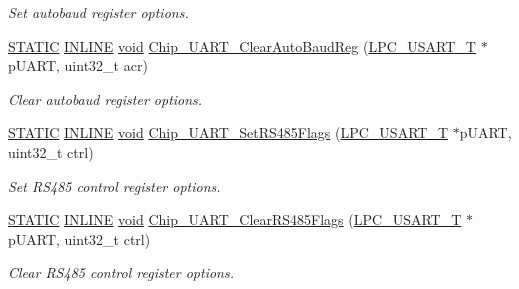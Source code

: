 \begin{DoxyCompactItemize}
\begin{DoxyCompactList}\small\item\em Set autobaud register options. \end{DoxyCompactList}\item 
\hyperlink{group__LPC__Types__Public__Macros_ga10b2d890d871e1489bb02b7e70d9bdfb}{S\-T\-A\-T\-I\-C} \hyperlink{group__LPC__Types__Public__Types_ga2eb6f9e0395b47b8d5e3eeae4fe0c116}{I\-N\-L\-I\-N\-E} \hyperlink{Paradigm_2Tern__EE_2small_2portmacro_8h_a14d32f8130d3c0b212cfc751730b5b49}{void} \hyperlink{group__UART__17XX__40XX_ga6a6d30f304047175780d16207bab2b09}{Chip\-\_\-\-U\-A\-R\-T\-\_\-\-Clear\-Auto\-Baud\-Reg} (\hyperlink{structLPC__USART__T}{L\-P\-C\-\_\-\-U\-S\-A\-R\-T\-\_\-\-T} $\ast$p\-U\-A\-R\-T, uint32\-\_\-t acr)
\begin{DoxyCompactList}\small\item\em Clear autobaud register options. \end{DoxyCompactList}\item 
\hyperlink{group__LPC__Types__Public__Macros_ga10b2d890d871e1489bb02b7e70d9bdfb}{S\-T\-A\-T\-I\-C} \hyperlink{group__LPC__Types__Public__Types_ga2eb6f9e0395b47b8d5e3eeae4fe0c116}{I\-N\-L\-I\-N\-E} \hyperlink{Paradigm_2Tern__EE_2small_2portmacro_8h_a14d32f8130d3c0b212cfc751730b5b49}{void} \hyperlink{group__UART__17XX__40XX_ga0bf41455dd390ae86f95f4bfe43a49a2}{Chip\-\_\-\-U\-A\-R\-T\-\_\-\-Set\-R\-S485\-Flags} (\hyperlink{structLPC__USART__T}{L\-P\-C\-\_\-\-U\-S\-A\-R\-T\-\_\-\-T} $\ast$p\-U\-A\-R\-T, uint32\-\_\-t ctrl)
\begin{DoxyCompactList}\small\item\em Set R\-S485 control register options. \end{DoxyCompactList}\item 
\hyperlink{group__LPC__Types__Public__Macros_ga10b2d890d871e1489bb02b7e70d9bdfb}{S\-T\-A\-T\-I\-C} \hyperlink{group__LPC__Types__Public__Types_ga2eb6f9e0395b47b8d5e3eeae4fe0c116}{I\-N\-L\-I\-N\-E} \hyperlink{Paradigm_2Tern__EE_2small_2portmacro_8h_a14d32f8130d3c0b212cfc751730b5b49}{void} \hyperlink{group__UART__17XX__40XX_ga27379f3351109d53453dfe4833e3f350}{Chip\-\_\-\-U\-A\-R\-T\-\_\-\-Clear\-R\-S485\-Flags} (\hyperlink{structLPC__USART__T}{L\-P\-C\-\_\-\-U\-S\-A\-R\-T\-\_\-\-T} $\ast$p\-U\-A\-R\-T, uint32\-\_\-t ctrl)
\begin{DoxyCompactList}\small\item\em Clear R\-S485 control register options. \end{DoxyCompactList}\item 

\end{DoxyCompactItemize}
